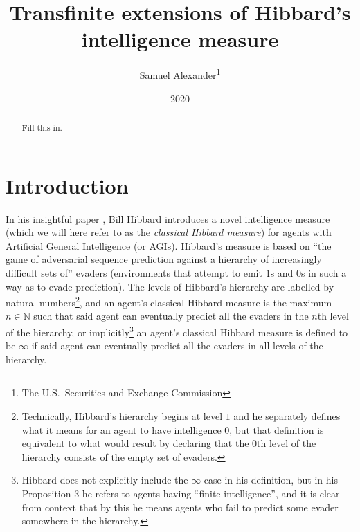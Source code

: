 \documentclass{article}
\title{Transfinite extensions of Hibbard's intelligence measure}
\author{Samuel Alexander\thanks{The U.S.\ Securities and Exchange Commission}}
\date{2020}
\begin{document}
\maketitle

\begin{abstract}
    Fill this in.
\end{abstract}

\section{Introduction}

In his insightful paper \cite{hibbard}, Bill Hibbard introduces a novel
intelligence measure (which we will here refer to as the \emph{classical Hibbard measure})
for agents with Artificial General Intelligence (or AGIs).
Hibbard's measure is based on ``the game of adversarial sequence prediction
against a hierarchy of increasingly difficult sets of'' evaders (environments that attempt
to emit $1$s and $0$s in such a way as to evade prediction).
The levels of Hibbard's hierarchy are labelled by natural numbers\footnote{Technically,
Hibbard's hierarchy begins at level $1$ and he separately defines what it means for
an agent to have intelligence $0$, but that definition is equivalent to what would result
by declaring that the $0$th level of the hierarchy consists of the empty set of evaders.}, and
an agent's classical Hibbard measure is the maximum $n\in\mathbb N$ such that
said agent can eventually predict all the evaders in the $n$th level of the hierarchy,
or implicitly\footnote{Hibbard does not explicitly include the $\infty$ case in his
definition, but in his Proposition 3 he refers to agents having ``finite intelligence'', and
it is clear from context that by this he means agents who fail to predict some evader
somewhere in the hierarchy.} an agent's classical Hibbard measure is defined to be $\infty$
if said agent can eventually predict all the evaders in all levels of the hierarchy.
\end{document}
